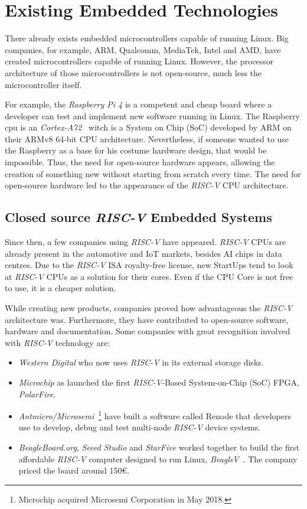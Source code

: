 \chapter{Existing Embedded Technologies}
\label{chapter:existing_embedded_technologies}
There already exists embedded microcontrollers capable of running Linux. Big companies, for example, ARM, Qualcomm, MediaTek, Intel and AMD, have created microcontrollers capable of running Linux. However, the processor architecture of those microcontrollers is not open-source, much less the microcontroller itself.

For example, the \textit{Raspberry Pi 4} is a competent and cheap board where a developer can test and implement new software running in Linux. The Raspberry \acrshort{cpu} is an \textit{Cortex-A72}~\cite{cortex_a72} witch is a System on Chip (SoC) developed by ARM on their ARMv8 64-bit CPU architecture. Nevertheless, if someone wanted to use the Raspberry as a base for his costume hardware design, that would be impossible. Thus, the need for open-source hardware appears, allowing the creation of something new without starting from scratch every time. The need for open-source hardware led to the appearance of the \textit{RISC-V} CPU architecture.


\section{Closed source \textit{RISC-V} Embedded Systems}
\label{section:closed_source}
Since then, a few companies using \textit{RISC-V} have appeared. \textit{RISC-V} CPUs are already present in the automotive and IoT markets, besides AI chips in data centres. Due to the \textit{RISC-V} ISA royalty-free license, new StartUps tend to look at \textit{RISC-V} CPUs as a solution for their cores. Even if the CPU Core is not free to use, it is a cheaper solution.

While creating new products, companies proved how advantageous the \textit{RISC-V} architecture was. Furthermore, they have contributed to open-source software, hardware and documentation. Some companies with great recognition involved with \textit{RISC-V} technology are:
\begin{itemize}
    \item \textit{Western Digital} who now uses \textit{RISC-V} in its external storage disks.
    \item \textit{Microchip} as launched the first \textit{RISC-V}-Based System-on-Chip (SoC) FPGA, \textit{PolarFire}.
    \item \textit{Antmicro/Microsemi}~\footnote{Microchip acquired Microsemi Corporation in May 2018.} have built a software called Renode that developers use to develop, debug and test multi-node \textit{RISC-V} device systems.
    \item \textit{BeagleBoard.org}, \textit{Seeed Studio} and \textit{StarFive} worked together to build the first affordable \textit{RISC-V} computer designed to run Linux, \textit{BeagleV}~\cite{beagleV}. The company priced the board around 150€.
\end{itemize}

